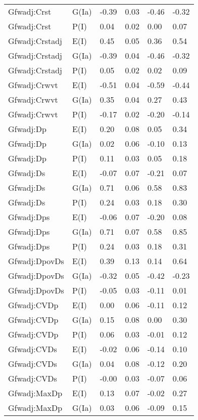 \begin{center}
\begin{longtable}{|p{1.1in}|p{0.7in}|p{0.7in}|p{0.6in}|p{0.6in}|p{0.6in}|}
  Gfwadj:Crst & G(Ia) & -0.39 & 0.03 & -0.46 & -0.32 \\ 
  Gfwadj:Crst & P(I) & 0.04 & 0.02 & 0.00 & 0.07 \\ 
  Gfwadj:Crstadj & E(I) & 0.45 & 0.05 & 0.36 & 0.54 \\ 
  Gfwadj:Crstadj & G(Ia) & -0.39 & 0.04 & -0.46 & -0.32 \\ 
  Gfwadj:Crstadj & P(I) & 0.05 & 0.02 & 0.02 & 0.09 \\ 
  Gfwadj:Crwvt & E(I) & -0.51 & 0.04 & -0.59 & -0.44 \\ 
  Gfwadj:Crwvt & G(Ia) & 0.35 & 0.04 & 0.27 & 0.43 \\ 
  Gfwadj:Crwvt & P(I) & -0.17 & 0.02 & -0.20 & -0.14 \\ 
  Gfwadj:Dp & E(I) & 0.20 & 0.08 & 0.05 & 0.34 \\ 
  Gfwadj:Dp & G(Ia) & 0.02 & 0.06 & -0.10 & 0.13 \\ 
  Gfwadj:Dp & P(I) & 0.11 & 0.03 & 0.05 & 0.18 \\ 
  Gfwadj:Ds & E(I) & -0.07 & 0.07 & -0.21 & 0.07 \\ 
  Gfwadj:Ds & G(Ia) & 0.71 & 0.06 & 0.58 & 0.83 \\ 
  Gfwadj:Ds & P(I) & 0.24 & 0.03 & 0.18 & 0.30 \\ 
  Gfwadj:Dps & E(I) & -0.06 & 0.07 & -0.20 & 0.08 \\ 
  Gfwadj:Dps & G(Ia) & 0.71 & 0.07 & 0.58 & 0.85 \\ 
  Gfwadj:Dps & P(I) & 0.24 & 0.03 & 0.18 & 0.31 \\ 
  Gfwadj:DpovDs & E(I) & 0.39 & 0.13 & 0.14 & 0.64 \\ 
  Gfwadj:DpovDs & G(Ia) & -0.32 & 0.05 & -0.42 & -0.23 \\ 
  Gfwadj:DpovDs & P(I) & -0.05 & 0.03 & -0.11 & 0.01 \\ 
  Gfwadj:CVDp & E(I) & 0.00 & 0.06 & -0.11 & 0.12 \\ 
  Gfwadj:CVDp & G(Ia) & 0.15 & 0.08 & 0.00 & 0.30 \\ 
  Gfwadj:CVDp & P(I) & 0.06 & 0.03 & -0.01 & 0.12 \\ 
  Gfwadj:CVDs & E(I) & -0.02 & 0.06 & -0.14 & 0.10 \\ 
  Gfwadj:CVDs & G(Ia) & 0.04 & 0.08 & -0.12 & 0.20 \\ 
  Gfwadj:CVDs & P(I) & -0.00 & 0.03 & -0.07 & 0.06 \\ 
  Gfwadj:MaxDp & E(I) & 0.13 & 0.07 & -0.02 & 0.27 \\ 
  Gfwadj:MaxDp & G(Ia) & 0.03 & 0.06 & -0.09 & 0.15 \\ 

\end{longtable}
\end{center}
